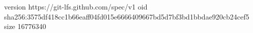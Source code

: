 version https://git-lfs.github.com/spec/v1
oid sha256:3575df418cc1b66eaff04fd015e6666409667bd5d7bf3bd1bbdae920cb24cef5
size 16776340
